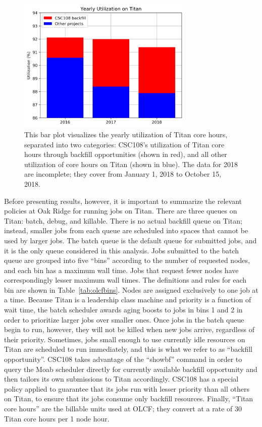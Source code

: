 \begin{figure}
  \includegraphics[width=0.75\textwidth]{images/barplot-jacks-slide.png}
\caption{This bar plot visualizes the yearly utilization of Titan core hours,
separated into two categories: CSC108's utilization of Titan core hours through
backfill opportunities (shown in red), and all other utilization of core hours
on Titan (shown in blue). The data for 2018 are incomplete; they cover from
January 1, 2018 to October 15, 2018.}
\label{fig:jacks-slide}
\end{figure}


Before presenting results, however, it is important to summarize the relevant
policies at Oak Ridge for running jobs on Titan. There are three queues on
Titan: batch, debug, and killable. There is no actual backfill queue on Titan;
instead, smaller jobs from each queue are scheduled into spaces that cannot be
used by larger jobs. The batch queue is the default queue for submitted jobs,
and it is the only queue considered in this analysis. Jobs submitted to the
batch queue are grouped into five ``bins'' according to the number of requested
nodes, and each bin has a maximum wall time. Jobs that request fewer nodes have
correspondingly lesser maximum wall times. The definitions and rules for each
bin are shown in Table~\ref{tab:olcfbins}. Nodes are assigned exclusively to
one job at a time. Because Titan is a leadership class machine and priority is
a function of wait time, the batch scheduler awards aging boosts to jobs in
bins 1 and 2 in order to prioritize larger jobs over smaller ones. Once jobs in
the batch queue begin to run, however, they will not be killed when new jobs
arrive, regardless of their priority. Sometimes, jobs small enough to use
currently idle resources on Titan are scheduled to run immediately, and this is
what we refer to as ``backfill opportunity''. CSC108 takes advantage of the
``showbf'' command in order to query the Moab scheduler directly for currently
available backfill opportunity and then tailors its own submissions to Titan
accordingly. CSC108 has a special policy applied to guarantee that its jobs run
with lesser priority than all others on Titan, to ensure that its jobs consume
only backfill resources. Finally, ``Titan core hours'' are the billable units
used at OLCF; they convert at a rate of 30 Titan core hours per 1 node hour.

